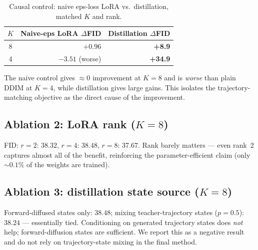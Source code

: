 \documentclass[11pt]{article}
\begin{document}
\begin{table}[H]
\centering
\caption{Causal control: naive eps-loss LoRA vs.\ distillation, matched $K$ and rank.}
\label{tab:causal}
\begin{tabular}{crr}
\toprule
$K$ & Naive-eps LoRA $\Delta$FID & Distillation $\Delta$FID \\
\midrule
8 & $+0.96$ & \textbf{+8.9} \\
4 & $-3.51$ (worse) & \textbf{+34.9} \\
\bottomrule
\end{tabular}
\end{table}

The naive control gives ${\approx}0$ improvement at $K=8$ and is \emph{worse} than plain
DDIM at $K=4$, while distillation gives large gains. This isolates the trajectory-matching
objective as the direct cause of the improvement.

\subsection{Ablation 2: LoRA rank ($K=8$)}
FID: $r{=}2$: $38.32$, $r{=}4$: $38.48$, $r{=}8$: $37.67$. Rank barely matters --- even
rank~2 captures almost all of the benefit, reinforcing the parameter-efficient claim (only
${\sim}0.1\%$ of the weights are trained).

\subsection{Ablation 3: distillation state source ($K=8$)}
Forward-diffused states only: $38.48$; mixing teacher-trajectory states ($p=0.5$): $38.24$
--- essentially tied. Conditioning on generated trajectory states does \emph{not} help;
forward-diffusion states are sufficient. We report this as a negative result and do not rely
on trajectory-state mixing in the final method.

\end{document}

